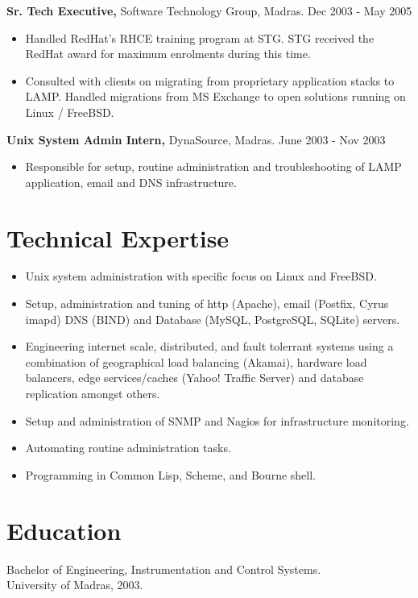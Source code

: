 \documentclass[margin]{res}
\begin{document}
\begin{resume}
\begin{itemize}
 \end{itemize}

{\bf Sr. Tech Executive,} Software Technology Group, Madras. \hfill Dec 2003 - May 2005
 \begin{itemize} \itemsep -2pt
 \item Handled RedHat's RHCE training program at STG. STG received the RedHat
   award for maximum enrolments during this time.
 \item Consulted with clients on migrating from proprietary application stacks
   to LAMP. Handled migrations from MS Exchange to open solutions running on 
   Linux / FreeBSD.
   
 \end{itemize}

{\bf Unix System Admin Intern,} DynaSource, Madras. \hfill June 2003 - Nov 2003
 \begin{itemize} \itemsep -2pt
 \item Responsible for setup, routine administration and troubleshooting 
   of LAMP \\ application, email and DNS infrastructure.
   
 \end{itemize}

\section{Technical Expertise} 
 \begin{itemize} \itemsep -2pt
 \item Unix system administration with specific focus on Linux and FreeBSD.
 \item Setup, administration and tuning of http (Apache), email (Postfix, Cyrus imapd)
   DNS (BIND) and Database (MySQL, PostgreSQL, SQLite) servers.
 \item Engineering internet scale, distributed, and fault tolerrant systems 
   using a combination of geographical load balancing (Akamai), hardware load 
   balancers, edge services/caches (Yahoo! Traffic Server) and database replication 
   amongst others.
 \item Setup and administration of SNMP and Nagios for infrastructure monitoring.
 \item Automating routine administration tasks.
 \item Programming in Common Lisp, Scheme, and Bourne shell.
   
 \end{itemize}

\section{Education} 
Bachelor of Engineering, Instrumentation and Control Systems.\\
University of Madras, 2003.


\end{resume} 
\end{document}
